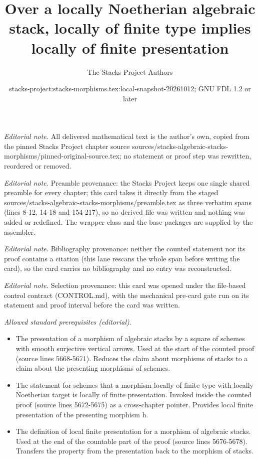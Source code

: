 \documentclass[10pt,a4paper]{amsart}
\title{Over a locally Noetherian algebraic stack, locally of finite type implies locally of finite presentation}
\author{The Stacks Project Authors}
\date{stacks-project:stacks-morphisms.tex:local-snapshot-20261012; GNU FDL 1.2 or later}
\theoremstyle{plain}
\theoremstyle{definition}
\theoremstyle{remark}
\numberwithin{equation}{subsection}
\begin{document}
\maketitle
\noindent\textit{Editorial note.} All delivered mathematical text is the author's own, copied from the pinned Stacks Project chapter source sources/stacks-algebraic-stacks-morphisms/pinned-original-source.tex; no statement or proof step was rewritten, reordered or removed.\par\medskip
\noindent\textit{Editorial note.} Preamble provenance: the Stacks Project keeps one single shared preamble for every chapter; this card takes it directly from the staged sources/stacks-algebraic-stacks-morphisms/preamble.tex as three verbatim spans (lines 8-12, 14-18 and 154-217), so no derived file was written and nothing was added or redefined. The wrapper class and the base packages are supplied by the assembler.\par\medskip
\noindent\textit{Editorial note.} Bibliography provenance: neither the counted statement nor its proof contains a citation (this lane rescans the whole span before writing the card), so the card carries no bibliography and no entry was reconstructed.\par\medskip
\noindent\textit{Editorial note.} Selection provenance: this card was opened under the file-based control contract (CONTROL.md), with the mechanical pre-card gate run on its statement and proof interval before the card was written.\par\medskip
\noindent\textit{Allowed standard prerequisites (editorial).}\begin{itemize}
\item The presentation of a morphism of algebraic stacks by a square of schemes with smooth surjective vertical arrows. Used at the start of the counted proof (source lines 5668-5671). Reduces the claim about morphisms of stacks to a claim about the presenting morphisms of schemes.
\item The statement for schemes that a morphism locally of finite type with locally Noetherian target is locally of finite presentation. Invoked inside the counted proof (source lines 5672-5675) as a cross-chapter pointer. Provides local finite presentation of the presenting morphism h.
\item The definition of local finite presentation for a morphism of algebraic stacks. Used at the end of the countable part of the proof (source lines 5676-5678). Transfers the property from the presentation back to the morphism of stacks.
\end{itemize}\medskip
\end{document}
